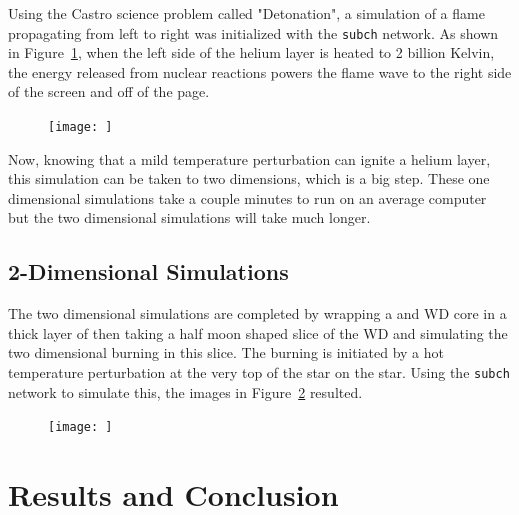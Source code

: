 \documentclass[preprint]{aastex62}
\begin{document}
      Using the Castro science problem called "Detonation", a simulation of a flame propagating from left to right was initialized with the {\tt subch} network. As shown in Figure~\ref{fig:detonation}, when the left side of the helium layer is heated to 2 billion Kelvin, the energy released from nuclear reactions powers the flame wave to the right side of the screen and off of the page. 
      
      \begin{figure}
        \centering
        \texttt{[image: ]}
        \caption{}
        \label{fig:detonation}
      \end{figure}
      
      Now, knowing that a mild temperature perturbation can ignite a helium layer, this simulation can be taken to two dimensions, which is a big step. These one dimensional simulations take a couple minutes to run on an average computer but the two dimensional simulations will take much longer. 
    
    \subsection{2-Dimensional Simulations}
  
      The two dimensional simulations are completed by wrapping a  and  WD core in a thick layer of  then taking a half moon shaped slice of the WD and simulating the two dimensional burning in this slice. The burning is initiated by a hot temperature perturbation at the very top of the star on the star. Using the {\tt subch} network to simulate this, the images in Figure~\ref{fig:subchsims} resulted. 
      
      
      \begin{figure}
        \centering
        \texttt{[image: ]}
        \caption{}
        \label{fig:subchsims}
      \end{figure}
      

\section{Results and Conclusion}

  
\end{document}
